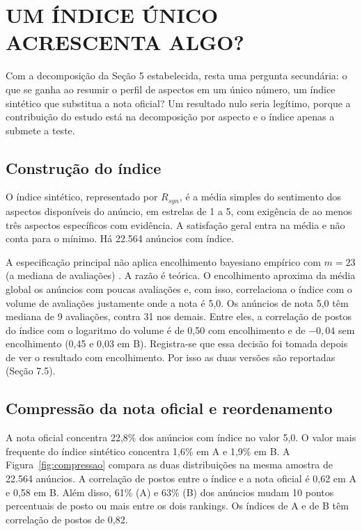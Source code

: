 \section{UM ÍNDICE ÚNICO ACRESCENTA ALGO?}

Com a decomposição da Seção 5 estabelecida, resta uma pergunta secundária: o que se ganha ao resumir o perfil de aspectos em um único número, um índice sintético que substitua a nota oficial? Um resultado nulo seria legítimo, porque a contribuição do estudo está na decomposição por aspecto e o índice apenas a submete a teste.

\subsection{Construção do índice}

O índice sintético, representado por $R_{syn}$, é a média simples do sentimento dos aspectos disponíveis do anúncio, em estrelas de 1 a 5, com exigência de ao menos três aspectos específicos com evidência. A satisfação geral entra na média e não conta para o mínimo. Há 22.564 anúncios com índice.

A especificação principal não aplica encolhimento bayesiano empírico com $m = 23$ (a mediana de avaliações) \citep{efron1975}. A razão é teórica. O encolhimento aproxima da média global os anúncios com poucas avaliações e, com isso, correlaciona o índice com o volume de avaliações justamente onde a nota é 5,0. Os anúncios de nota 5,0 têm mediana de 9 avaliações, contra 31 nos demais. Entre eles, a correlação de postos do índice com o logaritmo do volume é de 0,50 com encolhimento e de $-0{,}04$ sem encolhimento (0,45 e 0,03 em B). Registra-se que essa decisão foi tomada depois de ver o resultado com encolhimento. Por isso as duas versões são reportadas (Seção 7.5).

\subsection{Compressão da nota oficial e reordenamento}

A nota oficial concentra 22,8\% dos anúncios com índice no valor 5,0. O valor mais frequente do índice sintético concentra 1,6\% em A e 1,9\% em B. A Figura~\ref{fig:compressao} compara as duas distribuições na mesma amostra de 22.564 anúncios. A correlação de postos entre o índice e a nota oficial é 0,62 em A e 0,58 em B. Além disso, 61\% (A) e 63\% (B) dos anúncios mudam 10 pontos percentuais de posto ou mais entre os dois rankings. Os índices de A e de B têm correlação de postos de 0,82.

